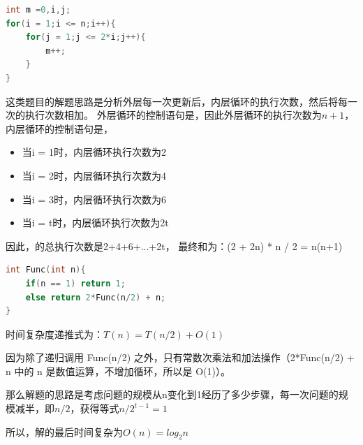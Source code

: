 \documentclass[b5paper,11pt]{article}
\begin{document}
\begin{lstlisting}[language=C]
int m =0,i,j;
for(i = 1;i <= n;i++){
    for(j = 1;j <= 2*i;j++){
        m++;
    }
}
\end{lstlisting}

这类题目的解题思路是分析外层每一次更新后，内层循环的执行次数，然后将每一次的执行次数相加。
外层循环的控制语句是，因此外层循环的执行次数为$n + 1$，内层循环的控制语句是，

\begin{itemize}
    \item 当i = 1时，内层循环执行次数为2
    \item 当i = 2时，内层循环执行次数为4
    \item 当i = 3时，内层循环执行次数为6
    \item 当i = t时，内层循环执行次数为2t
\end{itemize}
因此，的总执行次数是2+4+6+...+2t，
最终和为：(2 + 2n) * n / 2 = n(n+1)

\begin{lstlisting}[language=C]
int Func(int n){
    if(n == 1) return 1;
    else return 2*Func(n/2) + n;
}
\end{lstlisting}

时间复杂度递推式为：$T(n)=T(n/2)+O(1)$

因为除了递归调用 Func(n/2) 之外，只有常数次乘法和加法操作（2*Func(n/2) + n 中的 n 是数值运算，不增加循环，所以是 O(1)）。

那么解题的思路是考虑问题的规模从n变化到1经历了多少步骤，每一次问题的规模减半，即$n/2$，获得等式$n / 2^{t-1} = 1$

所以，解的最后时间复杂为$O(n) = log_2{n}$
\end{document}
